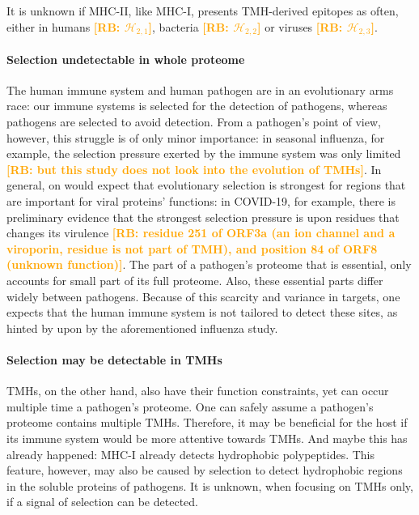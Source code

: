 \documentclass{article}
\newcommand{\richel}[1]{\textcolor{orange}{\textbf{[RB: #1]}}}
\begin{document}
It is unknown if MHC-II, like MHC-I, 
presents TMH-derived epitopes as often, either 
in humans \richel{$\mathcal{H}_{2,1}$},
bacteria \richel{$\mathcal{H}_{2,2}$}
or viruses \richel{$\mathcal{H}_{2,3}$}.

\paragraph{Selection undetectable in whole proteome}

The human immune system and human pathogen are in an evolutionary
arms race: our immune systems is selected for the detection
of pathogens, whereas pathogens are selected to avoid detection.
From a pathogen's point of view, however, this struggle 
is of only minor importance:
in seasonal influenza, for example, the selection pressure
exerted by the immune system was only limited \cite{han2019individual}
\richel{but this study does not look into the evolution of TMHs}.
In general, on would expect that evolutionary selection is strongest 
for regions that are important for viral proteins' functions:
in COVID-19, for example, there is preliminary evidence that the strongest
selection pressure is upon residues that changes its virulence \cite{velazquez2020positive}
\richel{residue 251 of ORF3a (an ion channel and a 
viroporin, residue is not part of TMH), and position 84 of ORF8 (unknown function)}.
The part of a pathogen's proteome that is essential, 
only accounts for small part of its full proteome.
Also, these essential parts differ widely between pathogens.
Because of this scarcity and variance in targets, 
one expects that the human immune system
is not tailored to detect these sites, 
as hinted by upon by the aforementioned influenza study.

\paragraph{Selection may be detectable in TMHs}

TMHs, on the other hand, also have their function constraints, 
yet can occur multiple time a pathogen's proteome.
One can safely assume a pathogen's proteome contains multiple TMHs.
Therefore, it may be beneficial for the host
if its immune system would be more attentive towards TMHs.
And maybe this has already happened: MHC-I already detects hydrophobic
polypeptides. This feature, however, may also be caused by selection
to detect hydrophobic regions in the soluble proteins of pathogens.
It is unknown, when focusing on TMHs only, if a signal of selection
can be detected.
\end{document}
